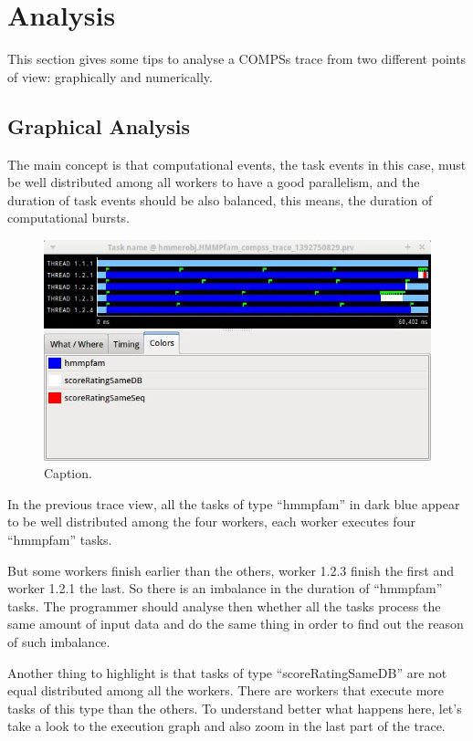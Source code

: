 \section{Analysis}
\label{sec:Analysis}
This section gives some tips to analyse a COMPSs trace from two different points of view:
graphically and numerically.

\subsection{Graphical Analysis}
The main concept is that computational events, the task events in this case, must be well 
distributed among all workers to have a good parallelism, and the duration of task events 
should be also balanced, this means, the duration of computational bursts.

\begin{figure}[ht!]
  \centering
    \includegraphics[width=1.0\textwidth]{./Sections/5_Analysis/Figures/8.jpeg}
    \caption{Caption.}
\end{figure}

In the previous trace view, all the tasks of type ``hmmpfam'' in dark blue appear to be well 
distributed among the four workers, each worker executes four ``hmmpfam'' tasks.

But some workers finish earlier than the others, worker 1.2.3 finish the first and worker 1.2.1 
the last. So there is an imbalance in the duration of ``hmmpfam'' tasks. The programmer should 
analyse then whether all the tasks process the same amount of input data and do the same thing 
in order to find out the reason of such imbalance.

Another thing to highlight is that tasks of type ``scoreRatingSameDB'' are not equal distributed 
among all the workers. There are workers that execute more tasks of this type than the others. 
To understand better what happens here, let’s take a look to the execution graph and also zoom 
in the last part of the trace.

